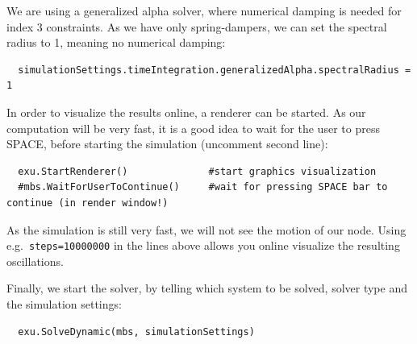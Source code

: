 %
We are using a generalized alpha solver, where numerical damping is needed for index 3 constraints. As we have only spring-dampers, we can set the spectral radius to 1, meaning no numerical damping:
\pythonstyle\begin{lstlisting}
  simulationSettings.timeIntegration.generalizedAlpha.spectralRadius = 1
\end{lstlisting}
%
In order to visualize the results online, a renderer can be started. As our computation will be very fast, it is a good idea to wait for the user to press SPACE, before starting the simulation (uncomment second line):
\pythonstyle\begin{lstlisting}
  exu.StartRenderer()              #start graphics visualization
  #mbs.WaitForUserToContinue()     #wait for pressing SPACE bar to continue (in render window!)
\end{lstlisting}
As the simulation is still very fast, we will not see the motion of our node. Using e.g.\ \texttt{steps=10000000} in the lines above allows you online visualize the resulting oscillations.

%
Finally, we start the solver, by telling which system to be solved, solver type and the simulation settings:
\pythonstyle\begin{lstlisting}
  exu.SolveDynamic(mbs, simulationSettings)
\end{lstlisting}
%

